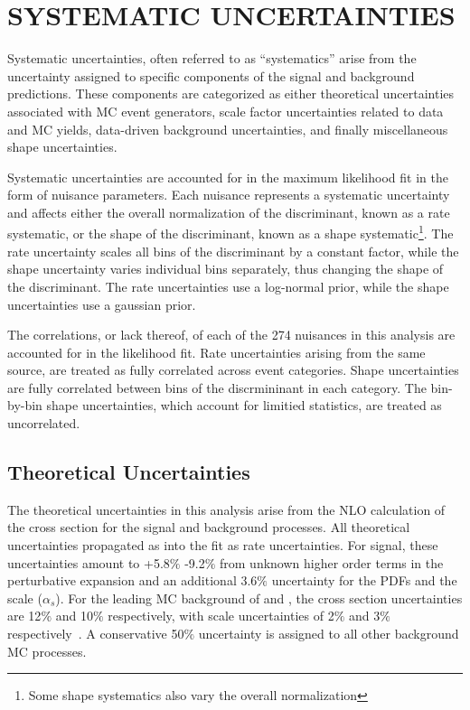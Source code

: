 %
%

\chapter{SYSTEMATIC UNCERTAINTIES}
Systematic uncertainties, often referred to as ``systematics'' arise from the uncertainty assigned to specific components of the signal
and background predictions. These components are categorized as either theoretical uncertainties associated with MC event generators, scale factor uncertainties
related to data and MC yields, data-driven background uncertainties, and finally miscellaneous shape uncertainties.  

Systematic uncertainties are accounted for in the maximum likelihood fit in the form of nuisance parameters. Each nuisance represents a systematic uncertainty
and affects either the overall normalization of the discriminant, known as a rate systematic, or the shape of the discriminant,
known as a shape systematic\footnote{Some shape systematics also vary the overall normalization}. The rate uncertainty scales all bins of the discriminant
by a constant factor, while the shape uncertainty varies individual bins separately, thus changing the shape of the discriminant.
The rate uncertainties use a log-normal prior, while the shape uncertainties use a gaussian prior. 

The correlations, or lack thereof, of each of the 274 nuisances in this analysis are accounted for in the likelihood fit. 
Rate uncertainties arising from the same source, are treated as fully correlated across event categories. Shape uncertainties are fully correlated between
bins of the discrmininant in each category. The bin-by-bin shape uncertainties, which account for limitied statistics, are treated as uncorrelated. 


\section{Theoretical Uncertainties}
The theoretical uncertainties in this analysis arise from the NLO calculation of the cross section for the signal and background processes.
All theoretical uncertainties propagated as into the fit as rate uncertainties. For \tth signal,
these uncertainties amount to +5.8$\%$ -9.2$\%$ from unknown higher order terms in the perturbative expansion and an additional 3.6$\%$ uncertainty for the
PDFs and the scale ($\alpha_{s}$). For the leading MC background of \ttw and \ttz, the cross section uncertainties are 12$\%$ and 10$\%$ respectively, with
scale uncertainties of 2$\%$ and 3$\%$ respectively~\cite{xsec_uncert}. A conservative 50$\%$ uncertainty is assigned to all other background MC processes. 

